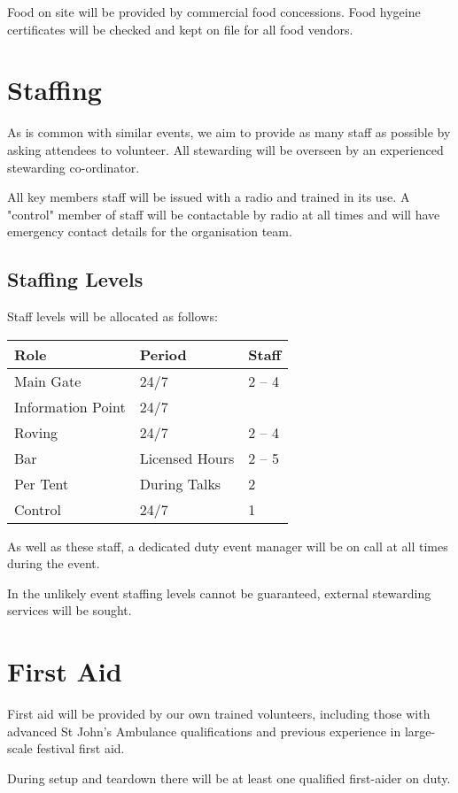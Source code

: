 Food on site will be provided by commercial food concessions. Food hygeine certificates will be checked and kept on file for all food vendors.

\section{Staffing}

As is common with similar events, we aim to provide as many staff as possible
by asking attendees to volunteer. All stewarding will be overseen by an experienced stewarding co-ordinator.

All key members staff will be issued with a radio and trained in its use. A "control" member of staff will be
contactable by radio at all times and will have emergency contact details for the organisation team.

\subsection{Staffing Levels}

Staff levels will be allocated as follows:

\begin{tabular}{l l l}
Role & Period & Staff \\
\hline
Main Gate & 24/7 & 2 -- 4 \\
Information Point & 24/7 & \\
Roving & 24/7 & 2 -- 4 \\
Bar & Licensed Hours & 2 -- 5 \\
Per Tent & During Talks & 2 \\
Control & 24/7 & 1
\end{tabular}

As well as these staff, a dedicated duty event manager will be on call at all times during the event.

In the unlikely event staffing levels cannot be guaranteed, external stewarding services will be sought.

\section{First Aid}

First aid will be provided by our own trained volunteers, including those with advanced St John's Ambulance
qualifications and previous experience in large-scale festival first aid.

During setup and teardown there will be at least one qualified first-aider on duty.

